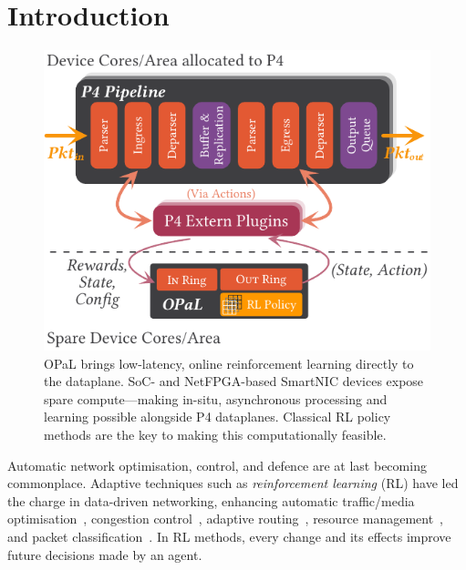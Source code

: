 \documentclass[
sigconf,natbib=false
]{acmart}
\newcommand{\approachshort}{OPaL}
\begin{document}
\section{Introduction}
\begin{figure}
	\centering
	\includegraphics[keepaspectratio, width=0.85\linewidth]{figures/arch-with-p4}
	\caption{\approachshort{} brings low-latency, online reinforcement learning directly to the dataplane. SoC- and NetFPGA-based SmartNIC devices expose spare compute---making in-situ, asynchronous processing and learning possible alongside P4 dataplanes. Classical RL policy methods are the key to making this computationally feasible.\label{fig:netro-arch}}
\end{figure}
Automatic network optimisation, control, and defence are at last becoming commonplace.
Adaptive techniques such as \emph{reinforcement learning} (RL) have led the charge in data-driven networking, enhancing automatic traffic/media optimisation~\parencite{DBLP:conf/sigcomm/ChenL0L18,DBLP:conf/sigcomm/MaoNA17}, congestion control~\parencite{DBLP:journals/corr/abs-1910-04054}, adaptive routing~\parencite{DBLP:conf/hotnets/ValadarskySST17,DBLP:conf/conext/GiladSGRS20}, resource management~\parencite{DBLP:conf/hotnets/MaoAMK16}, and packet classification~\parencite{DBLP:conf/sigcomm/LiangZJS19}.
In RL methods, every change and its effects improve future decisions made by an agent.
\end{document}

